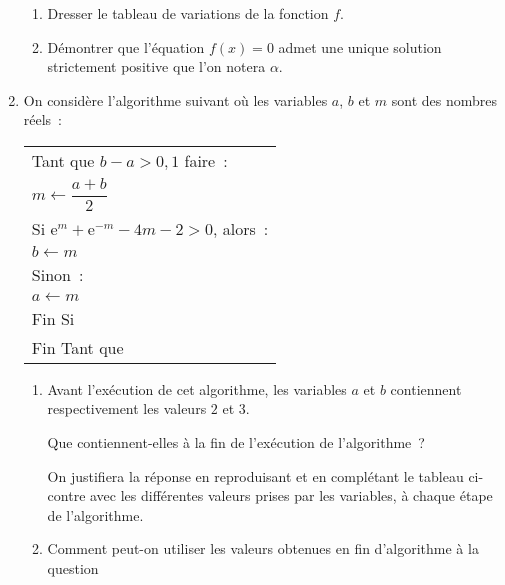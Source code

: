 \begin{enumerate}
     \begin{enumerate}[label=\alph*.]
          \item Dresser le tableau de variations de la fonction $f$.
          \item Démontrer que l'équation $f(x) = 0$ admet une unique solution strictement positive que l'on notera $\alpha$.
     \end{enumerate}
     \item On considère l'algorithme suivant où les variables $a$, $b$ et $m$ sont des nombres réels~:
     \begin{center}
          \begin{extern}%
               \begin{tabularx}{0.5\linewidth}{|X|}\hline
                    Tant que $b - a > 0,1$ faire~:\\
                    \hspace{1cm}$m \gets \dfrac{a+b}{2}$\\
                    \hspace{1cm}Si $\text{e}^m + \text{e}^{-m} - 4m - 2 > 0$, alors~:\\
                    \hspace{2cm}$b \gets m$\\
                    \hspace{1cm}Sinon~:\\
                    \hspace{2cm}$a\gets m$\\
                    \hspace{1cm}Fin Si\\
                    Fin Tant que\\ \hline
               \end{tabularx}
          \end{extern}
     \end{center}
     \begin{enumerate}[label=\alph*.]
          \item Avant l'exécution de cet algorithme, les variables $a$ et $b$
          contiennent respectivement les valeurs $2$ et $3$.
          \par
          Que contiennent-elles à la fin de l'exécution de l'algorithme~?
          \par
          On justifiera la réponse en reproduisant et en complétant le tableau ci-contre avec les différentes valeurs prises par les variables, à chaque étape de l'algorithme.
          \item Comment peut-on utiliser les valeurs obtenues en fin d'algorithme à la question

\end{enumerate}
\end{enumerate}
